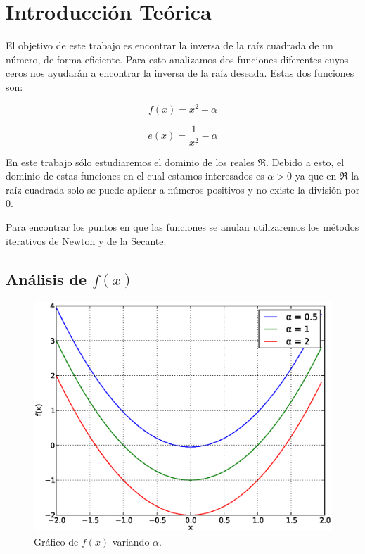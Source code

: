 \section{Introducción Teórica}

El objetivo de este trabajo es encontrar la inversa de la raíz cuadrada de un
número, de forma eficiente. Para esto analizamos dos funciones diferentes cuyos
ceros nos ayudarán a encontrar la inversa de la raíz deseada. Estas dos
funciones son:

\begin{equation}\label{f_x}
    f(x) = x^2 - \alpha
\end{equation}

\begin{equation}\label{e_x}
    e(x) = \frac{1}{x^2} - \alpha
\end{equation}

En este trabajo sólo estudiaremos el dominio de los reales $\Re$. Debido
a esto, el dominio de estas funciones en el cual estamos interesados es $\alpha
> 0$ ya que en $\Re$ la raíz cuadrada solo se puede aplicar a números
positivos y no existe la división por $0$.

Para encontrar los puntos en que las funciones se anulan utilizaremos los
métodos iterativos de Newton y de la Secante.

\subsection{Análisis de $f(x)$}\label{sec:analisis_f_x}

\begin{figure}[h]
  \begin{center}
    \includegraphics[scale=0.5]{graficos/new/f_x.eps}
    \caption{\label{fig:f_x} Gráfico de $f(x)$ variando $\alpha$.}
  \end{center}
\end{figure}

